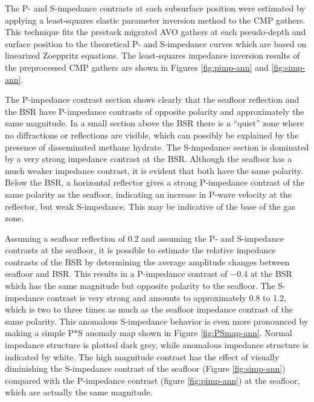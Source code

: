 The P- and S-impedance contrasts at each subsurface position were estimated 
by applying a least-squares elastic parameter inversion method 
\cite[]{lumley.sep.70.165,lumley.sep.77.211} to the CMP gathers. This technique
fits the prestack migrated AVO gathers at each pseudo-depth and surface 
position to the theoretical P- and S-impedance curves which are based on
linearized Zoeppritz equations. The least-squares impedance inversion results
of the preprocessed CMP gathers are shown in Figures \ref{fig:pimp-ann} and 
\ref{fig:simp-ann}.




The P-impedance contrast section shows clearly that the seafloor reflection 
and the BSR have P-impedance contrasts of opposite polarity and approximately
the same magnitude. In a small section above the BSR there is a ``quiet'' 
zone where no diffractions or reflections are visible, which can possibly 
be explained by the presence of disseminated methane hydrate. The 
S-impedance section is dominated by a very strong impedance contrast at the
BSR. Although the seafloor has a much weaker impedance contrast, it is evident 
that both have the same polarity. Below the BSR, a horizontal reflector gives
a strong P-impedance contrast of the same polarity as the seafloor, indicating
an increase in P-wave velocity at the reflector, but weak S-impedance. This may 
be indicative of the base of the gas zone.
\par
Assuming a seafloor reflection of 0.2 and assuming the P- and S-impedance 
contrasts at the seafloor, it is possible to estimate the relative impedance
contrasts of the BSR by determining the average amplitude changes between 
seafloor and BSR. This results in a P-impedance contrast of $-$0.4 at the
BSR which has the same magnitude but opposite polarity to the seafloor.
The S-impedance contrast is very strong and amounts to approximately 0.8
to 1.2, which is two to three times as much as the seafloor impedance 
contrast of the same polarity. This anomalous S-impedance behavior is even
more pronounced by making a simple P$*$S anomaly map shown in Figure 
\ref{fig:PSmap-ann}. Normal impedance structure is plotted dark grey, while
anomalous impedance structure is indicated by white. The high magnitude
contrast has the effect of visually diminishing the S-impedance contrast of
the seafloor (Figure \ref{fig:simp-ann})  compared with the P-impedance contrast
(figure \ref{fig:pimp-ann}) at the seafloor, which are actually the same magnitude.

